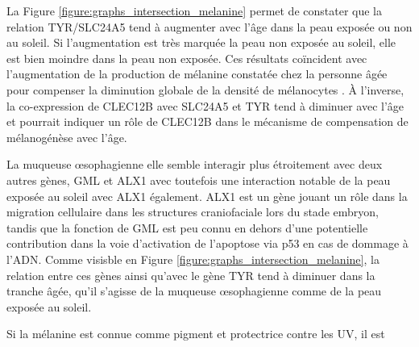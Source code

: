 La Figure \ref{figure:graphs_intersection_melanine} permet de constater que la relation TYR/SLC24A5 tend à augmenter avec l'âge dans la peau exposée ou non au soleil. Si l'augmentation est très marquée la peau non exposée au soleil, elle est bien moindre dans la peau non exposée. Ces résultats coïncident avec l'augmentation de la production de mélanine constatée chez la personne âgée pour compenser la diminution globale de la densité de mélanocytes \cite{Gilchrest1979}. À l'inverse, la co-expression de CLEC12B avec SLC24A5 et TYR tend à diminuer avec l'âge et pourrait indiquer un rôle de CLEC12B dans le mécanisme de compensation de mélanogénèse avec l'âge.

La muqueuse œsophagienne elle semble interagir plus étroitement avec deux autres gènes, GML et ALX1 avec toutefois une interaction notable de la peau exposée au soleil avec ALX1 également. ALX1 est un gène jouant un rôle dans la migration cellulaire dans les structures craniofaciale lors du stade embryon, tandis que la fonction de GML est peu connu en dehors d'une potentielle contribution dans la voie d'activation de l'apoptose via p53 en cas de dommage à l'ADN. Comme visisble en Figure \ref{figure:graphs_intersection_melanine}, la relation entre ces gènes ainsi qu'avec le gène TYR tend à diminuer dans la tranche âgée, qu'il s'agisse de la muqueuse œsophagienne comme de la peau exposée au soleil.


Si la mélanine est connue comme pigment et protectrice contre les UV, il est \cite{Tolleson2005}



